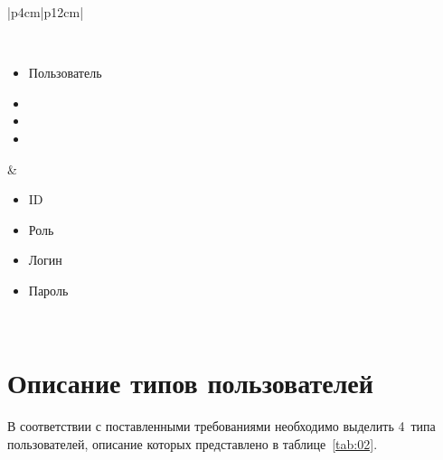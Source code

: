 \begin{table}[h!]
\begin{center}
\begin{threeparttable}
\begin{tabular}{|p{4cm}|p{12cm}|}
\begin{minipage}[t]{\linewidth}
\begin{multicols}{2}
              \end{multicols}
            \end{minipage}\\
            \hline
            \begin{minipage}[t]{\linewidth}
              \begin{multicols}{0}
                \begin{itemize}[leftmargin=0mm,labelsep=0mm,nosep,after=\strut]
                  \item[] Пользователь
                  \item[]
                  \item[]
                  \item[]
                \end{itemize}
              \end{multicols}
            \end{minipage}
          & \begin{minipage}[t]{\linewidth}
              \begin{multicols}{2}
                \begin{itemize}[leftmargin=0mm,labelsep=0mm,nosep,after=\strut]
                  \item[] ID
                  \item[] Роль
                  \item[] Логин
                  \item[] Пароль
                \end{itemize}
              \end{multicols}
            \end{minipage}\\
           \hline
        \end{tabular}
    \end{threeparttable}
    \end{center}
\end{table} 

\section{Описание типов пользователей}

В соответствии с поставленными требованиями необходимо выделить 4~типа
пользователей, описание которых представлено в таблице~\ref{tab:02}.

